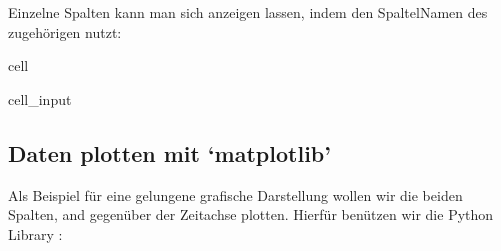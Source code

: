 \documentclass[letterpaper,10pt,english]{jupyterBook}
\begin{document}
\sphinxAtStartPar
Einzelne Spalten kann man sich anzeigen lassen, indem den Spaltel\sphinxhyphen{}Namen des zugehörigen  nutzt:

\begin{sphinxuseclass}{cell}\begin{sphinxVerbatimInput}

\begin{sphinxuseclass}{cell_input}
\begin{sphinxVerbatim}[commandchars=\\\{\}]
\PYG{p}{[}\PYG{p}{]}
\end{sphinxVerbatim}

\end{sphinxuseclass}\end{sphinxVerbatimInput}

\end{sphinxuseclass}

\subsection{Daten plotten mit ‘matplotlib’}
\label{\detokenize{content/1_APy_Plotten:daten-plotten-mit-matplotlib}}
\sphinxAtStartPar
Als Beispiel für eine gelungene grafische Darstellung wollen wir die beiden Spalten,  and  gegenüber der Zeitachse  plotten. Hierfür benützen wir die Python Library :
\end{document}
